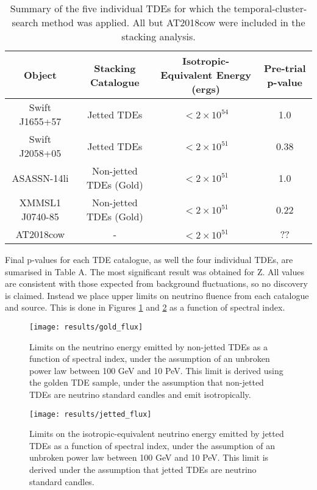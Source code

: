 \begin{table*}[]
	\centering
	\begin{tabular}{||c c c| c |} 
		\hline
		Object & Stacking Catalogue &  Isotropic-Equivalent Energy (ergs) & Pre-trial p-value\\ [0.5ex] 
		\hline\hline
		Swift J1655+57 & Jetted TDEs & $<2 \times 10^{54}$ & 1.0\\ 
		\hline
		Swift J2058+05 & Jetted TDEs & $<2 \times 10^{51}$& 0.38\\
		\hline
		ASASSN-14li & Non-jetted TDEs (Gold) & $<2 \times 10^{51}$& 1.0\\
		\hline
		XMMSL1 J0740-85 & Non-jetted TDEs (Gold)& $<2 \times 10^{51}$ & 0.22\\
		\hline
		\hline
		AT2018cow & - & $<2 \times 10^{51}$& ??\\
		[1ex] 
		\hline
	\end{tabular}
	\caption{Summary of the five individual TDEs for which the temporal-cluster-search method was applied. All but AT2018cow were included in the stacking analysis.}
	\label{tab:single_tests}
\end{table*}{}

Final p-values for each TDE catalogue, as well the four individual TDEs, are sumarised in Table A. The most significant result was obtained for Z. All values are consistent with those expected from background fluctuations, so no discovery is claimed. Instead we place upper limits on neutrino fluence from each catalogue and source. This is done in Figures \ref{fig:gold_flux} and \ref{fig:jetted_flux}  as a function of spectral index.

\begin{figure}[!ht]
	\centering \texttt{[image: results/gold\_flux]}
	\caption{Limits on the neutrino energy emitted by non-jetted TDEs as a function of spectral index, under the assumption of an unbroken power law between 100 GeV and 10 PeV. This limit is derived using the golden TDE sample, under the assumption that non-jetted TDEs are neutrino standard candles and emit isotropically.}
	\label{fig:gold_flux}
\end{figure}

\begin{figure}[!ht]
	\centering \texttt{[image: results/jetted\_flux]}
	\caption{Limits on the isotropic-equivalent neutrino energy emitted by jetted TDEs as a function of spectral index, under the assumption of an unbroken power law between 100 GeV and 10 PeV. This limit is derived under the assumption that jetted TDEs are neutrino standard candles.}
	\label{fig:jetted_flux}
\end{figure}

